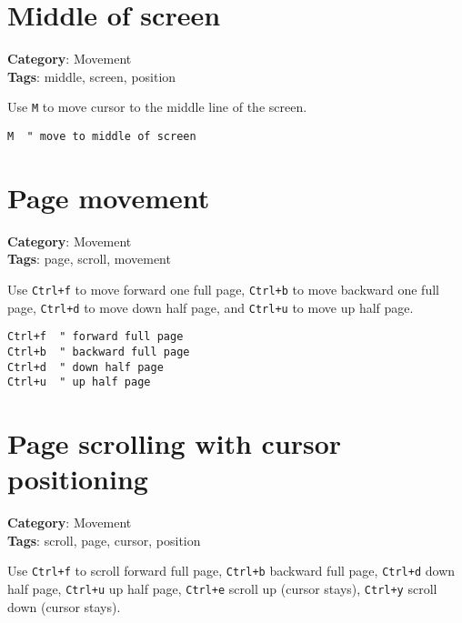 {{{{{{{\section{Middle of screen}

\textbf{Category}: Movement\\ \textbf{Tags}: middle, screen, position
\vspace{0.5cm}

Use {\footnotesize \Verb§M§} to move cursor to the middle line of the screen.

\begin{Exa*}{}
\begin{Verbatim}[fontsize=\footnotesize, breaklines, breakanywhere]
M  " move to middle of screen
\end{Verbatim}
\end{Exa*}

\section{Page movement}

\textbf{Category}: Movement\\ \textbf{Tags}: page, scroll, movement
\vspace{0.5cm}

Use {\footnotesize \Verb§Ctrl+f§} to move forward one full page, {\footnotesize \Verb§Ctrl+b§} to move backward one full page, {\footnotesize \Verb§Ctrl+d§} to move down half page, and {\footnotesize \Verb§Ctrl+u§} to move up half page.

\begin{Exa*}{}
\begin{Verbatim}[fontsize=\footnotesize, breaklines, breakanywhere]
Ctrl+f  " forward full page
Ctrl+b  " backward full page
Ctrl+d  " down half page
Ctrl+u  " up half page
\end{Verbatim}
\end{Exa*}

\section{Page scrolling with cursor positioning}

\textbf{Category}: Movement\\ \textbf{Tags}: scroll, page, cursor, position
\vspace{0.5cm}

Use {\footnotesize \Verb§Ctrl+f§} to scroll forward full page, {\footnotesize \Verb§Ctrl+b§} backward full page, {\footnotesize \Verb§Ctrl+d§} down half page, {\footnotesize \Verb§Ctrl+u§} up half page, {\footnotesize \Verb§Ctrl+e§} scroll up (cursor stays), {\footnotesize \Verb§Ctrl+y§} scroll down (cursor stays).

}}}}}}}
